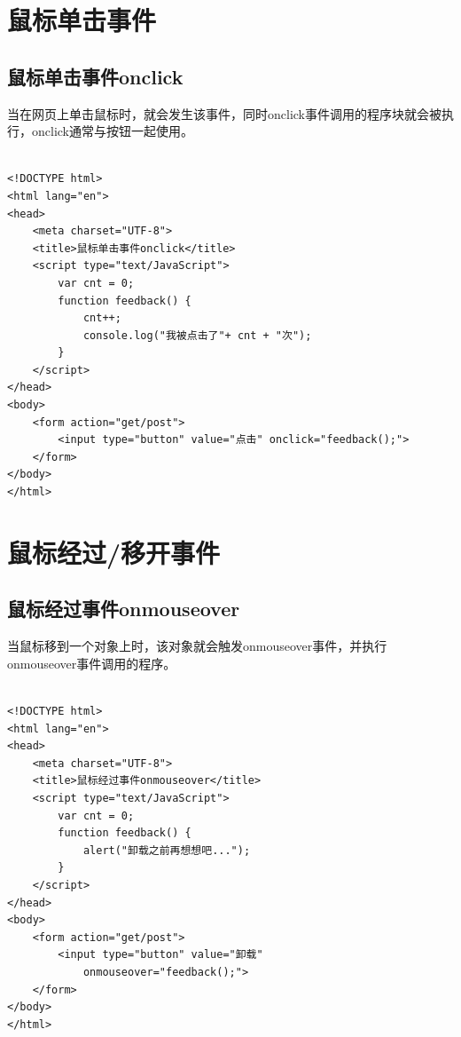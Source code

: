 \newpage

\section{鼠标单击事件}

\subsection{鼠标单击事件onclick}

当在网页上单击鼠标时，就会发生该事件，同时onclick事件调用的程序块就会被执行，onclick通常与按钮一起使用。 \\

 \\

\begin{lstlisting}[style=htmlcssjs]
<!DOCTYPE html>
<html lang="en">
<head>
    <meta charset="UTF-8">
    <title>鼠标单击事件onclick</title>
    <script type="text/JavaScript">
        var cnt = 0;
        function feedback() {
            cnt++;
            console.log("我被点击了"+ cnt + "次");
        }
    </script>
</head>
<body>
    <form action="get/post">
        <input type="button" value="点击" onclick="feedback();">
    </form>
</body>
</html>
\end{lstlisting}

\newpage

\section{鼠标经过/移开事件}

\subsection{鼠标经过事件onmouseover}

当鼠标移到一个对象上时，该对象就会触发onmouseover事件，并执行onmouseover事件调用的程序。 \\

 \\

\begin{lstlisting}[style=htmlcssjs]
<!DOCTYPE html>
<html lang="en">
<head>
    <meta charset="UTF-8">
    <title>鼠标经过事件onmouseover</title>
    <script type="text/JavaScript">
        var cnt = 0;
        function feedback() {
            alert("卸载之前再想想吧...");
        }
    </script>
</head>
<body>
    <form action="get/post">
        <input type="button" value="卸载"
            onmouseover="feedback();">
    </form>
</body>
</html>
\end{lstlisting}

